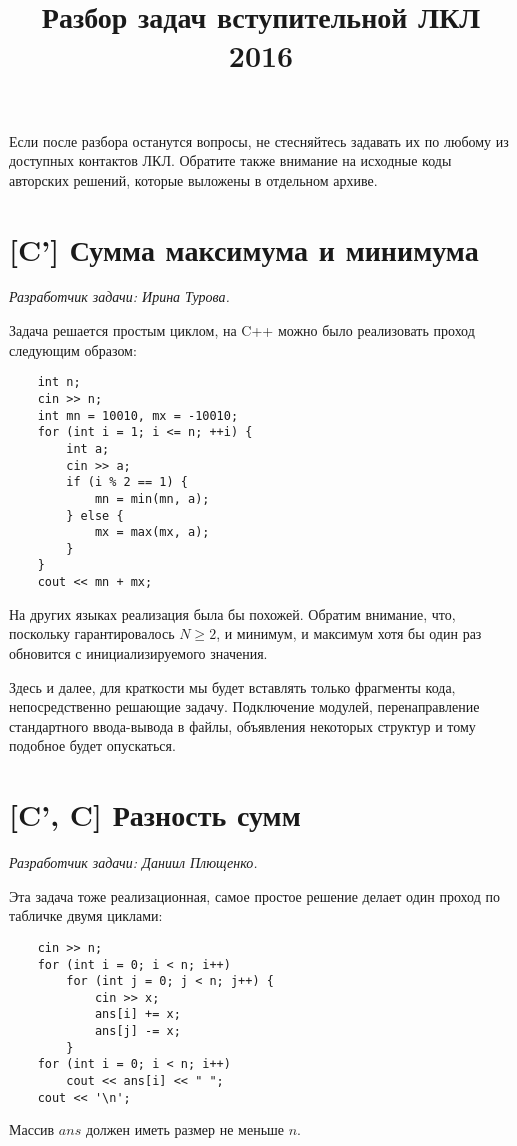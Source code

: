 \documentclass[12pt]{article}
\theoremstyle{definition}
\begin{document}
\title{Разбор задач вступительной ЛКЛ 2016}
\date{}

\renewcommand{\thesection}{\Alph{section}.}
\maketitle
Если после разбора останутся вопросы, не стесняйтесь задавать их по любому из доступных контактов ЛКЛ. Обратите также внимание на исходные коды авторских решений,
которые выложены в отдельном архиве.

\tableofcontents


\section{[C'] Сумма максимума и минимума}
\textit{Разработчик задачи: Ирина Турова.}

Задача решается простым циклом, на C++ можно было реализовать проход следующим образом:
\begin{lstlisting}
    int n;
    cin >> n;
    int mn = 10010, mx = -10010;
    for (int i = 1; i <= n; ++i) {
        int a;
        cin >> a;
        if (i % 2 == 1) {
            mn = min(mn, a);
        } else {
            mx = max(mx, a);
        }
    }
    cout << mn + mx;
\end{lstlisting}
На других языках реализация была бы похожей. Обратим внимание, что, поскольку гарантировалось $N \ge 2$, и минимум, и максимум хотя бы один раз обновится с инициализируемого значения.

Здесь и далее, для краткости мы будет вставлять только фрагменты кода, непосредственно
решающие задачу. Подключение модулей, перенаправление стандартного ввода-вывода в файлы,
объявления некоторых структур и тому подобное будет опускаться.


\pagebreak
\section{[C', C] Разность сумм}
\textit{Разработчик задачи: Даниил Плющенко.}

Эта задача тоже реализационная, самое простое решение делает один проход по табличке
двумя циклами:
\begin{lstlisting}
    cin >> n;
    for (int i = 0; i < n; i++)
        for (int j = 0; j < n; j++) {
            cin >> x;
            ans[i] += x;
            ans[j] -= x;
        }
    for (int i = 0; i < n; i++)
        cout << ans[i] << " ";
    cout << '\n';
\end{lstlisting}
Массив $ans$ должен иметь размер не меньше $n$.
\end{document}
